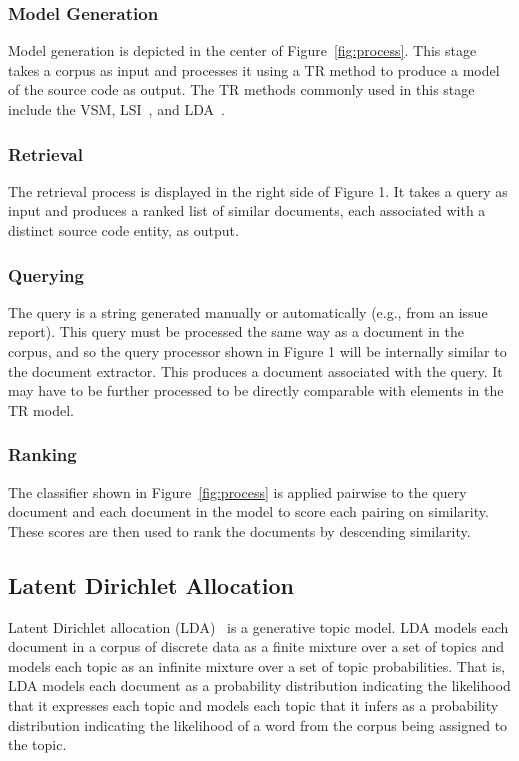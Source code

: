     \subsubsection{Model Generation}
    Model generation is depicted in the center of Figure~\ref{fig:process}.
    This stage takes a corpus as input and processes it using a TR method
    to produce a model of the source code as output.
    The TR methods commonly used in this stage include the VSM\needcite,
    LSI~\cite{Deerwester-etal:1990},
    and LDA~\cite{Blei-etal:2003}.

    \subsubsection{Retrieval}
    The retrieval process is displayed in the right side of Figure 1.
    It takes a query as input and produces a ranked list of similar documents,
    each associated with a distinct source code entity, as output.

    \subsubsection{Querying}
    The query is a string generated manually or automatically (e.g., from an issue report).
    This query must be processed the same way as a document in the corpus,
    and so the query processor shown in Figure 1 will be internally similar to the document extractor.
    This produces a document associated with the query.
    It may have to be further processed to be directly comparable with elements in the TR model.

    \subsubsection{Ranking}
    The classifier shown in Figure~\ref{fig:process} is applied pairwise to
    the query document and each document in the model
    to score each pairing on similarity.
    These scores are then used to rank the documents by descending similarity.

\subsection{Latent Dirichlet Allocation}

Latent Dirichlet allocation (LDA)~\cite{Blei-etal:2003} is a generative topic model.
LDA models each document in a corpus of discrete data as a finite mixture over a set of topics
and models each topic as an infinite mixture over a set of topic probabilities.
That is, LDA models each document as a probability distribution
indicating the likelihood that it expresses each topic and
models each topic that it infers as a probability distribution
indicating the likelihood of a word from the corpus being assigned to the topic.

